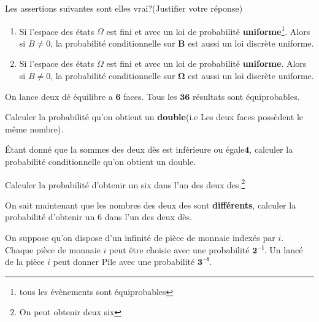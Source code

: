\documentclass[11pt,largemargins]{homework}
\begin{document}
\maketitle

Les assertions suivantes sont elles vrai?(Justifier votre réponse)

\begin{enumerate}
    \item Si l'espace des états $\Omega$ est fini et avec un loi de probabilité
        \textbf{uniforme}\footnote {tous les évènements sont équiprobables}. Alors si $B \neq 0$, la probabilité conditionnelle sur
        $\mathbf{B}$ est aussi un loi discrète uniforme.

    \item Si l'espace des états $\Omega$ est fini et avec un loi de probabilité
        \textbf{uniforme}. Alors si $B \neq 0$, la probabilité conditionnelle sur
        $\mathbf{\Omega}$ est aussi un loi discrète uniforme.
\end{enumerate}


On lance deux  dé équilibre a $\mathbf{6}$ faces. Tous les $\mathbf{36}$
résultats sont équiprobables.\\

\begin{arabicparts}
    \item Calculer la probabilité qu'on obtient un \textbf{double}(i.e Les deux
    faces possèdent le même nombre).
\item Étant donné que la sommes des deux dès est inférieure ou
    égale$\mathbf{4}$, calculer la probabilité conditionnelle qu'on obtient un
    double.

\item Calculer la probabilité d'obtenir un six dans l'un des deux
    des.\footnote{On peut obtenir deux six}
\item On sait maintenant que les nombres des deux des sont \textbf{différents},
    calculer la probabilité d'obtenir un $6$ dans l'un des deux dès.

\end{arabicparts}

On suppose qu'on dispose d'un infinité de pièce de monnaie indexés par $i$.
Chaque pièce de monnaie $i$ peut être choisie avec une probabilité
$\mathbf{2^{-i}}$. Un lancé de la pièce $i$ peut donner Pile avec une
probabilité $\mathbf{3^{-i}}$.\\[4pt]
\end{document}
